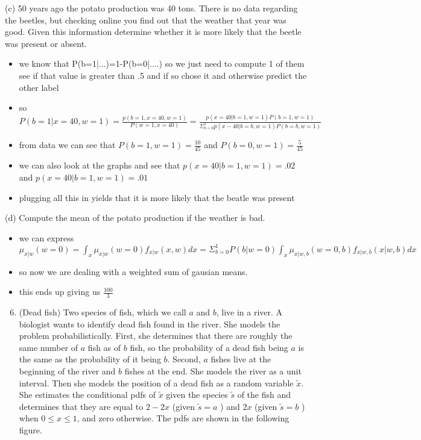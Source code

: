 \documentclass[10pt]{article}
\begin{document}
(c) 50 years ago the potato production was 40 tons. There is no data regarding the beetles, 
but checking online you find out that the weather that year was good. Given this information determine whether
it is more likely that the beetle was present or absent.
\begin{itemize}
    \item we know that P(b=1|...)=1-P(b=0|....) so we just need to compute 1 of them see if that value is greater than .5 and if so chose it and otherwise predict the other label 
    \item so $P(b=1|x=40,w=1)=\frac{p(b=1,x=40,w=1)}{P(w=1,x=40)}=\frac{p(x=40|b=1,w=1)P(b=1,w=1)}{\Sigma_{b=0}^{1}p(x-40|b=b,w=1)P(b=b,w=1)}$
    \item from data we can see that $P(b=1,w=1)=\frac{10}{45}$ and $P(b=0,w=1)=\frac{5}{45}$
    \item we can also look at the graphs and see that $p(x=40|b=1,w=1)=.02$ and $p(x=40|b=1,w=1)=.01$
    \item plugging all this in yields that it is more likely that the beatle was present 
\end{itemize}

(d) Compute the mean of the potato production if the weather is bad.

\begin{itemize}
    \item we can express $\mu_{x|w}(w=0)=\int_{x}\mu_{x|w}(w=0)f_{x|w}(x,w)dx=\Sigma_{b=0}^{1}P(b|w=0)\int_{x}\mu_{x|w,b}(w=0,b)f_{x|w,b}(x|w,b)dx$
    \item so now we are dealing with a weighted sum of gausian means. 
    \item this ends up giving us $\frac{100}{3}$
\end{itemize}
 
\begin{enumerate}
  \setcounter{enumi}{5}
  \item (Dead fish) Two species of fish, which we call $a$ and $b$, live in a river. A biologist wants to identify dead fish found in the river. She models the problem probabilistically. First, she determines that there are roughly the same number of $a$ fish as of $b$ fish, so the probability of a dead fish being $a$ is the same as the probability of it being $b$. Second, $a$ fishes live at the beginning of the river and $b$ fishes at the end. She models the river as a unit interval. Then she models the position of a dead fish as a random variable $\tilde{x}$. She estimates the conditional pdfs of $\tilde{x}$ given the species $\tilde{s}$ of the fish and determines that they are equal to $2-2 x$ (given $\tilde{s}=a$ ) and $2 x$ (given $\tilde{s}=b$ ) when $0 \leq x \leq 1$, and zero otherwise. The pdfs are shown in the following figure.
\end{enumerate}
\end{document}
